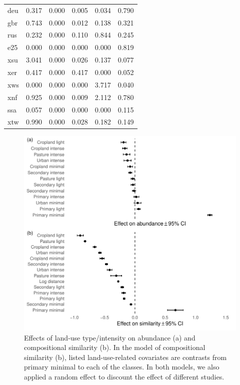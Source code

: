 \documentclass[titlesmallcaps,copyrightpage]{uomthesis}\usepackage[]{graphicx}\usepackage[]{color}
\begin{document}
\begin{table}[htb]
\begin{tabularx}{0.55\textwidth}{lllllY}
deu    & 0.317    & 0.000   & 0.005   & 0.034     & 0.790 \\
gbr    & 0.743    & 0.000   & 0.012   & 0.138     & 0.321 \\
rus    & 0.232    & 0.000   & 0.110   & 0.844     & 0.245 \\
e25    & 0.000    & 0.000   & 0.000   & 0.000     & 0.819 \\
xsu    & 3.041    & 0.000   & 0.026   & 0.137     & 0.077 \\
xer    & 0.417    & 0.000   & 0.417   & 0.000     & 0.052 \\
xws    & 0.000    & 0.000   & 0.000   & 3.717     & 0.040 \\
xnf    & 0.925    & 0.000   & 0.009   & 2.112     & 0.780 \\
ssa    & 0.057    & 0.000   & 0.000   & 0.000     & 0.115 \\
xtw    & 0.990    & 0.000   & 0.028   & 0.182     & 0.149 \\
\bottomrule
\end{tabularx}
\end{table}



\begin{figure}[htb]
  \centering
    \includegraphics{chapters/figures/chapter4/fig_bdeffects.pdf} 
    \caption{Effects of land-use type/intensity on abundance (a) and compositional similarity (b). In the model of compositional similarity (b), listed land-use-related covariates are contrasts from primary minimal to each of the classes. In both models, we also applied a random effect to discount the effect of different studies.}
    \label{apx:ch4:fig_bdeffects}
\end{figure}
\end{document}
